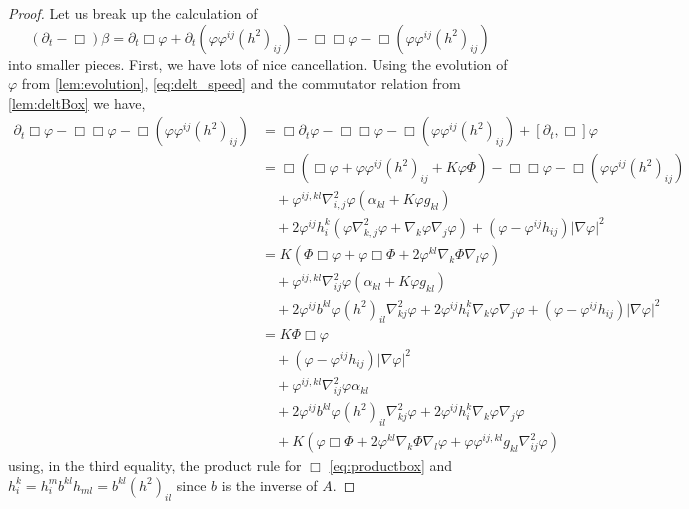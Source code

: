 \documentclass{amsart}
\begin{document}
\begin{proof}
Let us break up the calculation of
\[
(\partial_{t} - \Box)\beta =  \partial_{t}\Box\varphi + \partial_{t} (\varphi\varphi^{ij} (h^2)_{ij}) - \Box\Box\varphi - \Box(\varphi\varphi^{ij} (h^2)_{ij})
\]
into smaller pieces. First, we have lots of nice cancellation. Using the evolution of \(\varphi\) from \cref{lem:evolution}, \cref{eq:delt_speed} and the commutator relation from \cref{lem:deltBox} we have,
\begin{equation}
\label{eq:deltbeta1}
\begin{split}
\partial_{t}\Box\varphi - \Box\Box\varphi - \Box(\varphi\varphi^{ij} (h^2)_{ij}) &= \Box\partial_t\varphi - \Box\Box\varphi - \Box(\varphi\varphi^{ij} (h^2)_{ij}) + [\partial_t, \Box] \varphi \\
&= \Box(\Box \varphi + \varphi\varphi^{ij}(h^2)_{ij} + K \varphi\Phi) - \Box\Box\varphi - \Box(\varphi\varphi^{ij} (h^2)_{ij}) \\
&\quad + \varphi^{ij,kl} \nabla^2_{i,j} \varphi (\alpha_{kl} + K \varphi g_{kl}) \\
&\quad + 2\varphi^{ij}h^{k}_{i} (\varphi \nabla^2_{k,j} \varphi + \nabla_k \varphi \nabla_j \varphi) + (\varphi - \varphi^{ij}h_{ij})| \nabla\varphi|^{2} \\
&= K (\Phi \Box \varphi + \varphi \Box \Phi + 2 \varphi^{kl} \nabla_k \Phi \nabla_l \varphi) \\
&\quad + \varphi^{ij,kl} \nabla^2_{ij} \varphi (\alpha_{kl} + K \varphi g_{kl}) \\
&\quad + 2\varphi^{ij}b^{kl} \varphi (h^2)_{il} \nabla^2_{kj} \varphi + 2\varphi^{ij}h^{k}_{i} \nabla_k \varphi \nabla_j \varphi + (\varphi - \varphi^{ij}h_{ij})| \nabla\varphi|^{2} \\
&= K \Phi \Box \varphi  \\
&\quad + (\varphi - \varphi^{ij}h_{ij})| \nabla\varphi|^{2} \\
&\quad + \varphi^{ij,kl} \nabla^2_{ij} \varphi \alpha_{kl} \\
&\quad + 2\varphi^{ij}b^{kl} \varphi (h^2)_{il} \nabla^2_{kj} \varphi + 2\varphi^{ij}h^{k}_{i} \nabla_k \varphi \nabla_j \varphi \\
&\quad + K(\varphi \Box \Phi + 2 \varphi^{kl} \nabla_k \Phi \nabla_l \varphi + \varphi \varphi^{ij,kl} g_{kl} \nabla^2_{ij} \varphi)
\end{split}
\end{equation}
using, in the third equality, the product rule for \(\Box\) \cref{eq:productbox} and \(h^k_i = h^m_i b^{kl}h_{ml} = b^{kl} (h^2)_{il}\) since \(b\) is the inverse of \(A\).


\end{proof}
\end{document}

